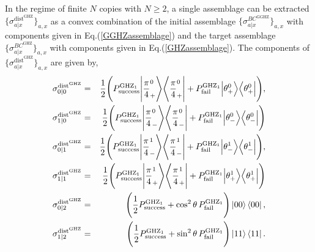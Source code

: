 \documentclass[reprint,superscriptaddress,nofootinbib,amsmath,amssymb,aps,pra,longbibliography]{revtex4-1}
\begin{document}
 In the regime of finite $N$ copies with $N \geq 2$, a single assemblage can be extracted  $\{\sigma_{a|x}^{\text{dist}^{\text{GHZ}}} \}_{a,x}$ as a convex combination of the initial assemblage $\{\sigma_{a|x}^{BC^{\text{GGHZ}}}\}_{a,x}$ with components given in Eq.(\ref{GGHZassemblage}) and the target assemblage $\{\sigma_{a|x}^{{BC}^{\text{GHZ}}}\}_{a,x}$ with components given in Eq.(\ref{GHZassemblage}). The components of $\{\sigma_{a|x}^{\text{dist}^{\text{GHZ}}} \}_{a,x}$ are given by,
\begin{eqnarray}
	\sigma_{0|0}^{\text{dist}^{\text{GHZ}}} &=& \frac{1}{2} \Bigg( P^{\text{GHZ}_1}_{\text{success}}\Bigg| \frac{\pi}{4}_+^0 \Bigg\rangle \Bigg\langle \frac{\pi}{4}_+^0 \Bigg| + P^{\text{GHZ}_1}_{\text{fail}} \Big| \theta_+^0 \Big\rangle \Big\langle \theta_+^0 \Big| \Bigg),\nonumber \\ \sigma_{1|0}^{\text{dist}^{\text{GHZ}}} &=& \frac{1}{2} \Bigg( P^{\text{GHZ}_1}_{\text{success}} \Bigg| \frac{\pi}{4}_-^0 \Bigg\rangle \Bigg\langle \frac{\pi}{4}_-^0 \Bigg| + P^{\text{GHZ}_1}_{\text{fail}} \Big| \theta_-^0 \Big\rangle \Big\langle \theta_-^0 \Big| \Bigg) \nonumber\\
	\sigma_{0|1}^{\text{dist}^{\text{GHZ}}} &=& \frac{1}{2} \Bigg( P^{\text{GHZ}_1}_{\text{success}} \Bigg| \frac{\pi}{4}_-^1 \Bigg\rangle \Bigg\langle \frac{\pi}{4}_-^1 \Bigg| + P^{\text{GHZ}_1}_{\text{fail}} \Big| \theta_-^1 \Big\rangle \Big\langle \theta_-^1 \Big| \Bigg),\nonumber \\ \sigma_{1|1}^{\text{dist}^{\text{GHZ}}} &=& \frac{1}{2} \Bigg( P^{\text{GHZ}_1}_{\text{success}} \Bigg| \frac{\pi}{4}_+^1 \Bigg\rangle \Bigg\langle \frac{\pi}{4}_+^1 \Bigg| + P^{\text{GHZ}_1}_{\text{fail}}\Big| \theta_+^1 \Big\rangle \Big\langle \theta_+^1 \Big| \Bigg) \nonumber \\
	\sigma_{0|2}^{\text{dist}^{\text{GHZ}}} &=& \Bigg( \frac{1}{2} P^{\text{GHZ}_1}_{\text{success}} + \cos^2\theta \, P^{\text{GHZ}_1}_{\text{fail}} \Bigg) \ket{00}\bra{00},\nonumber \\ \sigma_{1|2}^{\text{dist}^{\text{GHZ}}} &=& \Bigg(\frac{1}{2} P^{\text{GHZ}_1}_{\text{success}} + \sin^2\theta \, P^{\text{GHZ}_1}_{\text{fail}} \Bigg)\ket{11}\bra{11}.
	\label{GGHZdistill}
\end{eqnarray}
\end{document}
